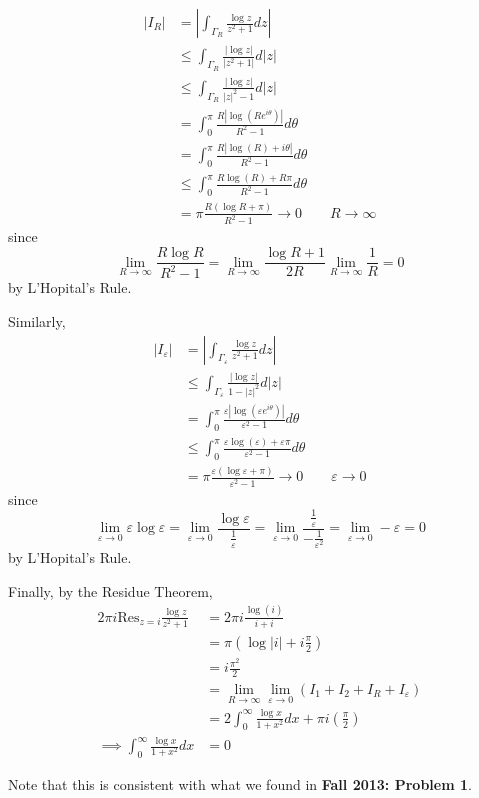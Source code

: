 \documentclass[12pt]{Homework}
\newcommand{\res}{\text{Res}}
\begin{document}
\begin{solution}
\begin{align*}
    |I_R|&=\left|\int_{\Gamma_R}\frac{\log z}{z^2+1}dz\right|\\
    &\le\int_{\Gamma_R}\frac{|\log z|}{|z^2+1|}d|z|\\
    &\le\int_{\Gamma_R}\frac{|\log z|}{|z|^2-1}d|z|\\
    &=\int_0^\pi\frac{R|\log(Re^{i\theta})|}{R^2-1}d\theta\\
    &=\int_0^\pi\frac{R|\log(R)+i\theta|}{R^2-1}d\theta\\
    &\le\int_0^\pi\frac{R\log(R)+R\pi}{R^2-1}d\theta\\
    &=\pi\frac{R(\log R+\pi)}{R^2-1}\to0\qquad R\to\infty
\end{align*} since $$\lim_{R\to\infty}\frac{R\log R}{R^2-1}=\lim_{R\to\infty}\frac{\log R+1}{2R}\lim_{R\to\infty}\frac{1}{R}=0$$ by L'Hopital's Rule.

Similarly, \begin{align*}
    |I_\varepsilon|&=\left|\int_{\Gamma_\varepsilon}\frac{\log z}{z^2+1}dz\right|\\
    &\le\int_{\Gamma_\varepsilon}\frac{|\log z|}{1-|z|^2}d|z|\\
    &=\int_0^\pi\frac{\varepsilon|\log(\varepsilon e^{i\theta})|}{\varepsilon^2-1}d\theta\\
    &\le\int_0^\pi\frac{\varepsilon\log(\varepsilon)+\varepsilon\pi}{\varepsilon^2-1}d\theta\\
    &=\pi\frac{\varepsilon(\log \varepsilon+\pi)}{\varepsilon^2-1}\to0\qquad \varepsilon\to0
\end{align*} since $$\lim_{\varepsilon\to0}\varepsilon\log\varepsilon=\lim_{\varepsilon\to0}\frac{\log\varepsilon}{\frac{1}{\varepsilon}}=\lim_{\varepsilon\to0}\frac{\frac{1}{\varepsilon}}{-\frac{1}{\varepsilon^2}}=\lim_{\varepsilon\to0}-\varepsilon=0$$ by L'Hopital's Rule.

Finally, by the Residue Theorem, \begin{align*}
    2\pi i\res_{z=i}\frac{\log z}{z^2+1}&=2\pi i\frac{\log(i)}{i+i}\\
    &=\pi\left(\log|i|+i\frac{\pi}{2}\right)\\
    &=i\frac{\pi^2}{2}\\
    &=\lim_{R\to\infty}\lim_{\varepsilon\to0}(I_1+I_2+I_R+I_\varepsilon)\\
    &=2\int_0^\infty\frac{\log x}{1+x^2}dx+\pi i\left(\frac{\pi}{2}\right)\\
    \implies \int_0^\infty\frac{\log x}{1+x^2}dx&=0
\end{align*}

Note that this is consistent with what we found in \textbf{Fall 2013: Problem 1}.
\end{solution}
\newpage
\end{document}
